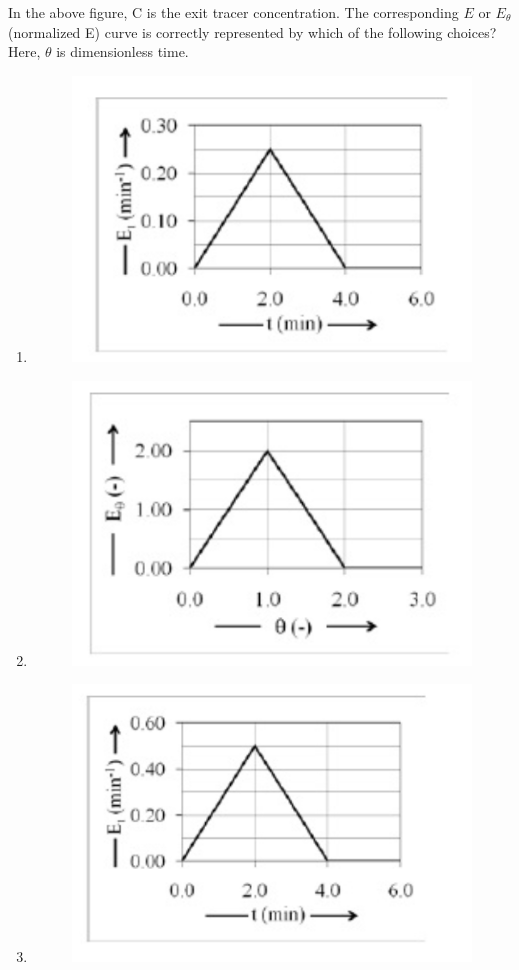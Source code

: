 \documentclass[journal,12pt,onecolumn]{IEEEtran}
\theoremstyle{remark}
\begin{document}
\begin{enumerate}
In the above figure, C is the exit tracer concentration. The corresponding $E$ or $E_\theta$(normalized E) curve is correctly represented by which of the following choices? Here, $\theta $ is dimensionless time.

\hfill{}
\begin{multicols}{2}
    \begin{enumerate}
        \item \begin{figure}[H]
            \includegraphics[width=0.5\linewidth]{figs/58a.png}
            \label{fig:58a}
        \end{figure}

         \item \begin{figure}[H]
            \includegraphics[width=0.5\linewidth]{figs/58b.png}
            \label{fig:58b}
        \end{figure}

         \item \begin{figure}[H]
            \includegraphics[width=0.5\linewidth]{figs/58c.png}
            \label{fig:58c}
        \end{figure}


\end{enumerate}
\end{multicols}
\end{enumerate}
\end{document}
